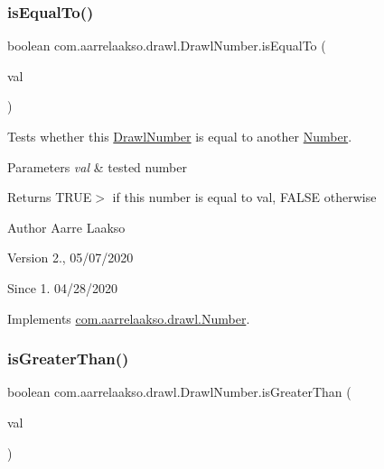 \subsubsection{\texorpdfstring{is\+Equal\+To()}{isEqualTo()}}
{\footnotesize\ttfamily boolean com.\+aarrelaakso.\+drawl.\+Drawl\+Number.\+is\+Equal\+To (\begin{DoxyParamCaption}\item[{@Not\+Null final \hyperlink{interfacecom_1_1aarrelaakso_1_1drawl_1_1_number}{Number}}]{val }\end{DoxyParamCaption})}



Tests whether this \hyperlink{classcom_1_1aarrelaakso_1_1drawl_1_1_drawl_number}{Drawl\+Number} is equal to another \hyperlink{interfacecom_1_1aarrelaakso_1_1drawl_1_1_number}{Number}. 


\begin{DoxyParams}{Parameters}
{\em val} & tested number \\
\hline
\end{DoxyParams}
\begin{DoxyReturn}{Returns}
{\ttfamily T\+R\+UE}$>$ if this number is equal to val, {\ttfamily F\+A\+L\+SE} otherwise 
\end{DoxyReturn}
\begin{DoxyAuthor}{Author}
Aarre Laakso 
\end{DoxyAuthor}
\begin{DoxyVersion}{Version}
2., 05/07/2020 
\end{DoxyVersion}
\begin{DoxySince}{Since}
1. 04/28/2020 
\end{DoxySince}


Implements \hyperlink{interfacecom_1_1aarrelaakso_1_1drawl_1_1_number_aa8ef6fc2e77da054f3a42f2cd81ec8a6}{com.\+aarrelaakso.\+drawl.\+Number}.

\mbox{\label{classcom_1_1aarrelaakso_1_1drawl_1_1_drawl_number_a17616696cef2e7b72d2614481182293a}} 
\subsubsection{\texorpdfstring{is\+Greater\+Than()}{isGreaterThan()}\hspace{0.1cm}{\footnotesize\ttfamily [1/2]}}
{\footnotesize\ttfamily boolean com.\+aarrelaakso.\+drawl.\+Drawl\+Number.\+is\+Greater\+Than (\begin{DoxyParamCaption}\item[{@Not\+Null final \hyperlink{interfacecom_1_1aarrelaakso_1_1drawl_1_1_number}{Number}}]{val }\end{DoxyParamCaption})}



